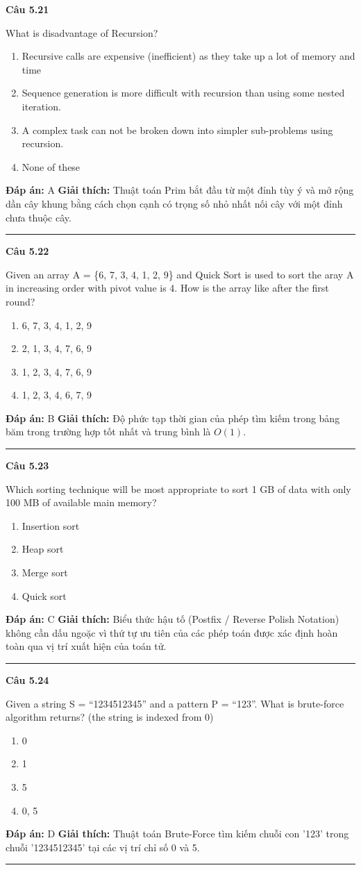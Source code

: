 \documentclass[11pt,a4paper]{article}
\newenvironment{question}[1]{%
  \par\vspace{1em}\noindent\textbf{\large Câu #1}\par\vspace{0.4em}
}{%
  \par\vspace{1em}\hrule\vspace{0.6em}
}
\newenvironment{choices}{%
  \begin{enumerate}[label=\textbf{\Alph*.},leftmargin=2.2em,itemsep=2pt,topsep=3pt]
}{%
  \end{enumerate}
}
\newcommand{\choice}{\item}
\begin{document}
\begin{question}{5.21}
What is disadvantage of Recursion?
\begin{choices}
\choice Recursive calls are expensive (inefficient) as they take up a lot of memory and time
\choice Sequence generation is more difficult with recursion than using some nested iteration.
\choice A complex task can not be broken down into simpler sub-problems using recursion.
\choice None of these
\end{choices}
\textbf{Đáp án:} A
\textbf{Giải thích:} Thuật toán Prim bắt đầu từ một đỉnh tùy ý và mở rộng dần cây khung bằng cách chọn cạnh có trọng số nhỏ nhất nối cây với một đỉnh chưa thuộc cây.
\end{question}

\begin{question}{5.22}
Given an array A = \{6, 7, 3, 4, 1, 2, 9\} and Quick Sort is used to sort the aray A in increasing order with pivot value is 4. How is the array like after the first round?
\begin{choices}
\choice 6, 7, 3, 4, 1, 2, 9
\choice 2, 1, 3, 4, 7, 6, 9
\choice 1, 2, 3, 4, 7, 6, 9
\choice 1, 2, 3, 4, 6, 7, 9
\end{choices}
\textbf{Đáp án:} B
\textbf{Giải thích:} Độ phức tạp thời gian của phép tìm kiếm trong bảng băm trong trường hợp tốt nhất và trung bình là $O(1)$.
\end{question}

\begin{question}{5.23}
Which sorting technique will be most appropriate to sort 1 GB of data with only 100 MB of available main memory?
\begin{choices}
\choice Insertion sort
\choice Heap sort
\choice Merge sort
\choice Quick sort
\end{choices}
\textbf{Đáp án:} C
\textbf{Giải thích:} Biểu thức hậu tố (Postfix / Reverse Polish Notation) không cần dấu ngoặc vì thứ tự ưu tiên của các phép toán được xác định hoàn toàn qua vị trí xuất hiện của toán tử.
\end{question}

\begin{question}{5.24}
Given a string S = ``1234512345'' and a pattern P = ``123''. What is brute-force algorithm returns? (the string is indexed from 0)
\begin{choices}
\choice 0
\choice 1
\choice 5
\choice 0, 5
\end{choices}
\textbf{Đáp án:} D
\textbf{Giải thích:} Thuật toán Brute-Force tìm kiếm chuỗi con '123' trong chuỗi '1234512345' tại các vị trí chỉ số 0 và 5.
\end{question}
\end{document}
